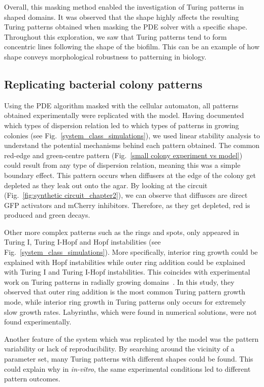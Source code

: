 Overall, this masking method enabled the investigation of Turing patterns in shaped domains.
It was observed that the shape highly affects the resulting Turing patterns obtained when masking the PDE solver with a specific shape.
Throughout this exploration, we saw that Turing patterns tend to form concentric lines following the shape of the biofilm.
This can be an example of how shape conveys morphological robustness to patterning in biology.


\subsection{Replicating bacterial colony patterns}
Using the PDE algorithm masked with the cellular automaton, all patterns obtained experimentally were replicated with the model.
Having documented which types of dispersion relation led to which types of patterns in growing colonies (see Fig.~\ref{system_class_simulations}), we used linear stability analysis to understand the potential mechanisms behind each pattern obtained.
The common red-edge and green-centre pattern (Fig.~\ref{small colony experiment vs model}) could result from any type of dispersion relation, meaning this was a simple boundary effect.
This pattern occurs when diffusers at the edge of the colony get depleted as they leak out onto the agar.
By looking at the circuit (Fig.~\ref{fig:synthetic circuit_chapter2}), we can observe that diffusors are direct GFP activators and mCherry inhibitors.
Therefore, as they get depleted, red is produced and green decays.

Other more complex patterns such as the rings and spots, only appeared in Turing I, Turing I-Hopf and Hopf instabilities (see Fig.~\ref{system_class_simulations}).
More specifically, interior ring growth could be explained with Hopf instabilities while outer ring addition could be explained with Turing I and Turing I-Hopf instabilities.
This coincides with experimental work on Turing patterns in radially growing domains~\parencite{Konow2019}.
In this study, they observed that outer ring addition is the most common Turing pattern growth mode, while interior ring growth in Turing patterns only occurs for extremely slow growth rates.
Labyrinths, which were found in numerical solutions, were not found experimentally.

Another feature of the system which was replicated by the model was the pattern variability or lack of reproducibility.
By searching around the vicinity of a parameter set, many Turing patterns with different shapes could be found.
This could explain why in \textit{in-vitro}, the same experimental conditions led to different pattern outcomes.

